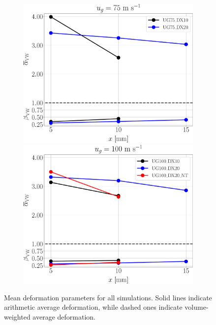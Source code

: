 \begin{figure}[ht]
\centering
\begin{subfigure}[b]{1.0\textwidth}
	\centering
   \includegraphics[scale=0.225]{./part2_developments/figures_ch5_resolved_JICF/SPRAY_characterization/deformation/ug75_both_alpha_beta_mean}
   \hspace{0.1in}
   \centering
   \includegraphics[scale=0.225]{./part2_developments/figures_ch5_resolved_JICF/SPRAY_characterization/deformation/ug100_both_alpha_beta_mean}
\end{subfigure}

   \caption[Mean deformation parameters for all simulations]{Mean deformation parameters for all simulations. Solid lines indicate arithmetic average deformation, while dashed ones indicate volume-weighted average deformation.}
\label{fig:jicf_liquid_mean_deformation_with_x_condensed}
\end{figure}


